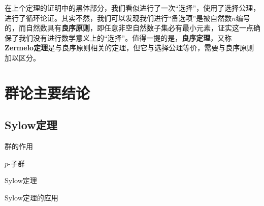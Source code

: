 \documentclass[../main.tex]{subfiles}
\begin{document}
\begin{remark}
在上个定理的证明中的黑体部分，我们看似进行了一次“选择”，使用了选择公理，进行了循环论证。其实不然，我们可以发现我们进行“备选项”是被自然数$n$编号的，而自然数具有\textbf{良序原则}，即任意非空自然数子集必有最小元素，证实这一点确保了我们没有进行数学意义上的“选择”。值得一提的是，\textbf{良序定理}，又称\textbf{Zermelo定理}是与良序原则相关的定理，但它与选择公理等价，需要与良序原则加以区分。
\end{remark}
\section{群论主要结论}
\subsection{Sylow定理}
\begin{introduction}
\item 群的作用
\item $p$-子群
\item Sylow定理
\item Sylow定理的应用
\end{introduction}
\end{document}
